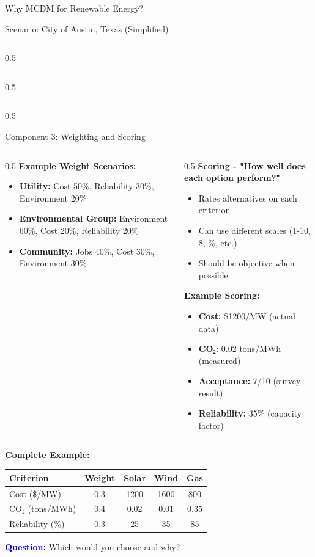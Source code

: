 \documentclass[aspectratio=169]{beamer}
\begin{document}
\begin{frame}{Why MCDM for Renewable Energy?}
\begin{center}
\begin{block}{Scenario: City of Austin, Texas (Simplified)}
\begin{column}{0.5\textwidth}
\begin{itemize}
\begin{column}{0.5\textwidth}
\begin{itemize}
\begin{columns}
\begin{column}{0.5\textwidth}
\begin{center}
\begin{frame}{Component 3: Weighting and Scoring}
\begin{columns}
\begin{column}{0.5\textwidth}
\textbf{Example Weight Scenarios:}
\begin{itemize}
\item \textbf{Utility:} Cost 50\%, Reliability 30\%, Environment 20\%
\item \textbf{Environmental Group:} Environment 60\%, Cost 20\%, Reliability 20\%
\item \textbf{Community:} Jobs 40\%, Cost 30\%, Environment 30\%
\end{itemize}
\end{column}
\begin{column}{0.5\textwidth}
\textbf{\textcolor{solarorange}{Scoring - "How well does each option perform?"}}
\begin{itemize}
\item Rates alternatives on each criterion
\item Can use different scales (1-10, \$, \%, etc.)
\item Should be objective when possible
\end{itemize}

\textbf{Example Scoring:}
\begin{itemize}
\item \textbf{Cost:} \$1200/MW (actual data)
\item \textbf{CO₂:} 0.02 tons/MWh (measured)
\item \textbf{Acceptance:} 7/10 (survey result)
\item \textbf{Reliability:} 35\% (capacity factor)
\end{itemize}
\end{column}
\end{columns}

\vspace{0.3cm}
\textbf{Complete Example:}
\begin{center}
\begin{tabular}{|l|c|c|c|c|}
\hline
\textbf{Criterion} & \textbf{Weight} & \textbf{Solar} & \textbf{Wind} & \textbf{Gas} \\
\hline
Cost (\$/MW) & 0.3 & 1200 & 1600 & 800 \\
CO₂ (tons/MWh) & 0.4 & 0.02 & 0.01 & 0.35 \\
Reliability (\%) & 0.3 & 25 & 35 & 85 \\
\hline
\end{tabular}
\end{center}
\textcolor{blue}{\textbf{Question:}} Which would you choose and why?
\end{frame}


\end{center}
\end{column}
\end{columns}
\end{itemize}
\end{column}
\end{itemize}
\end{column}
\end{block}
\end{center}
\end{frame}
\end{document}
